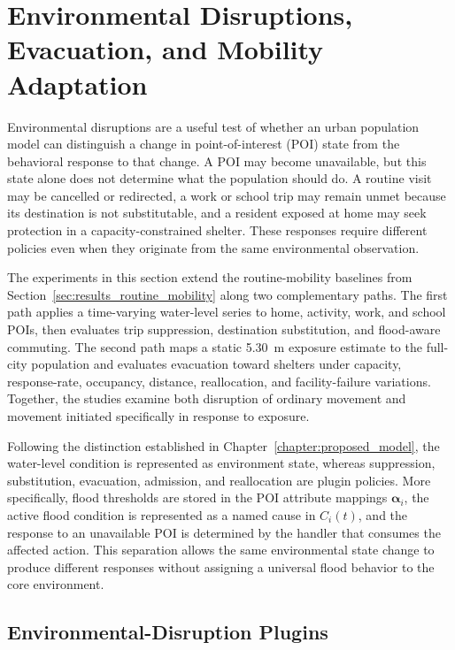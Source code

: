 \section{Environmental Disruptions, Evacuation, and Mobility Adaptation}
\label{sec:results_environment_disruptions}

Environmental disruptions are a useful test of whether an urban population model can distinguish a change in point-of-interest (POI) state from the behavioral response to that change. A POI may become unavailable, but this state alone does not determine what the population should do. A routine visit may be cancelled or redirected, a work or school trip may remain unmet because its destination is not substitutable, and a resident exposed at home may seek protection in a capacity-constrained shelter. These responses require different policies even when they originate from the same environmental observation.

The experiments in this section extend the routine-mobility baselines from Section~\ref{sec:results_routine_mobility} along two complementary paths. The first path applies a time-varying water-level series to home, activity, work, and school POIs, then evaluates trip suppression, destination substitution, and flood-aware commuting. The second path maps a static 5.30~m exposure estimate to the full-city population and evaluates evacuation toward shelters under capacity, response-rate, occupancy, distance, reallocation, and facility-failure variations. Together, the studies examine both disruption of ordinary movement and movement initiated specifically in response to exposure.

Following the distinction established in Chapter~\ref{chapter:proposed_model}, the water-level condition is represented as environment state, whereas suppression, substitution, evacuation, admission, and reallocation are plugin policies. More specifically, flood thresholds are stored in the POI attribute mappings $\bm{\alpha}_i$, the active flood condition is represented as a named cause in $C_i(t)$, and the response to an unavailable POI is determined by the handler that consumes the affected action. This separation allows the same environmental state change to produce different responses without assigning a universal flood behavior to the core environment.

\subsection{Environmental-Disruption Plugins}
\label{sec:environment_disruption_plugins}

